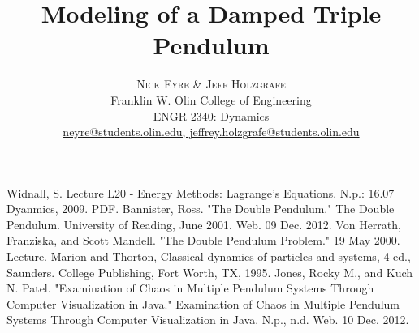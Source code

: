 \documentclass[twoside]{article}
\title{\vspace{-15mm}\fontsize{18pt}{4pt}\selectfont\textbf{Modeling of a Damped Triple Pendulum}} %
\author{
\large
\textsc{Nick Eyre \& Jeff Holzgrafe}\\[2mm] %
\normalsize Franklin W. Olin College of Engineering \\ %
\normalsize ENGR 2340: Dynamics \\ %
\normalsize \href{mailto:neyre@students.olin.edu,jeffrey.holzgrafe@students.olin.edu}{neyre@students.olin.edu, jeffrey.holzgrafe@students.olin.edu} %
\vspace{-5mm}
}
\date{}
\begin{document}
\maketitle

\begin{abstract}
    
\end{abstract}

\begin{multicols}{2} %
    
    
    
    
    
    
    
    
    
    
    \begin{thebibliography}{99} %
        Widnall, S. Lecture L20 - Energy Methods: Lagrange’s Equations. N.p.: 16.07 Dyanmics, 2009. PDF. 
        Bannister, Ross. "The Double Pendulum." The Double Pendulum. University of Reading, June 2001. Web. 09 Dec. 2012.
        Von Herrath, Franziska, and Scott Mandell. "The Double Pendulum Problem." 19 May 2000. Lecture.
        Marion and Thorton, Classical dynamics of particles and systems, 4 ed., Saunders. College Publishing, Fort Worth, TX, 1995.
        Jones, Rocky M., and Kuch N. Patel. "Examination of Chaos in Multiple Pendulum Systems Through Computer Visualization in Java." Examination of Chaos in Multiple Pendulum Systems Through Computer Visualization in Java. N.p., n.d. Web. 10 Dec. 2012.
    \end{thebibliography}
\end{multicols}

\appendix
    \gdef\thesection{Appendix \Alph{section}}
    
\end{document}
